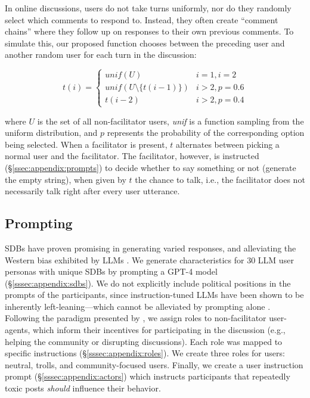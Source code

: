 In online discussions, users do not take turns uniformly, nor do they randomly select which comments to respond to. Instead, they often create ``comment chains'' where they follow up on responses to their own previous comments. To simulate this, our proposed function chooses between the preceding user and another random user for each turn in the discussion:

\small
\begin{equation}
\label{eq:turn_taking}
    t(i) = \left\{
\begin{array}{ll}
    \textit{unif}(U) & i=1, i=2\\
    \textit{unif}(U \setminus \{t(i-1)\}) & i > 2, p=0.6 \\
    t(i-2) & i > 2, p=0.4 
\end{array} 
\right.
\end{equation}
\normalsize

\noindent where $U$ is the set of all non-facilitator users, \textit{unif} is a function sampling from the uniform distribution, and $p$ represents the probability of the corresponding option being selected. When a facilitator is present, $t$ alternates between picking a normal user and the facilitator. The facilitator, however, is instructed (\S\ref{ssec:appendix:prompts}) to decide whether to say something or not (generate the empty string), when given by $t$ the chance to talk, i.e., the facilitator does not necessarily talk right after every user utterance. 


\subsection{Prompting}
\label{ssec:methodology:prompts}

\acfp{SDB} have proven promising in generating varied responses, and alleviating the Western bias exhibited by \acp{LLM} \cite{burton2024large}. We generate characteristics for 30 \ac{LLM} user personas with unique \acp{SDB} by prompting a GPT-4 model \cite{openai2024gpt4technicalreport} (\S\ref{sssec:appendix:sdbs}). We do not explicitly include political positions in the prompts of the participants, since instruction-tuned \acp{LLM} have been shown to be inherently left-leaning---which cannot be alleviated by prompting alone \cite{Taubenfeld2024SystematicBI}. %
Following the paradigm presented by \citet{abdelnabi_negotiations}, we assign roles to non-facilitator user-agents, which inform their incentives for participating in the discussion (e.g., helping the community or disrupting discussions). Each role was mapped to specific instructions (\S\ref{sssec:appendix:roles}). We create three roles for users: neutral, trolls, and community-focused users.                                      
Finally, we create a user instruction prompt (\S\ref{sssec:appendix:actors}) which instructs participants that repeatedly toxic posts \emph{should} influence their behavior. 